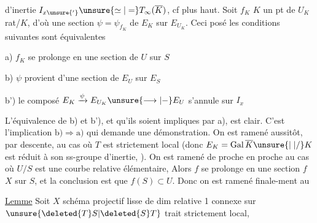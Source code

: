 d'inertie $I_{x\unsure{'}}\unsure{\simeq|=}T_\infty(\overline K)$, cf plus haut. Soit $f_K$ $K$ un pt de $U_K$ rat/$K$, d'où une section $\psi=\psi_{f_K}$ de $E_K$ sur $E_{U_K}$. Ceci posé les conditions suivantes sont équivalentes

\noindent a) $f_K$ se prolonge en une section de $U$ sur $S$

\noindent b) $\psi$ provient d'une section de $E_U$ sur $E_S$

\noindent b') le composé $E_K\xrightarrow{\psi}E_{U_K}\unsure{\longrightarrow|-}E_U$ s'annule sur $I_x$


L'équivalence de b) et b'), et qu'ils soient impliques par a), est clair. C'est l'implication $\mathrm{b)}\Longrightarrow\mathrm{a)}$ qui demande une démonstration. On est ramené aussitôt, par descente, au cas  où $T$ est strictement local (donc $E_K=\operatorname{Gal}\overline K\unsure{\mid|/}K$ est réduit à son ss-groupe d'inertie, ). On est ramené de proche en proche au cas où $U/S$ est une courbe relative élémentaire,   \unsure{\deleted{,}|,}  Alors $f$ se prolonge en une section $f$   $X$ sur $S$, et la conclusion est que $f(S)\subset U$. Donc on est ramené finale-\newline ment au

\uline{Lemme} Soit $X$ schéma projectif lisse de dim relative 1 connexe sur $\unsure{\deleted{T}S|\deleted{S}T}$ trait strictement local,

